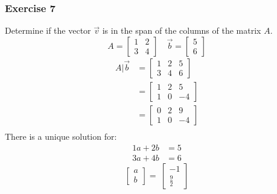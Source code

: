 \documentclass{math}
\begin{document}
\subsubsection*{Exercise 7}
Determine if the vector \( \vec{v} \) is in the span of the columns of the
matrix \( A \).
\[ A = \begin{bmatrix}1 & 2 \\ 3 & 4\end{bmatrix} \quad
  \vec{b} = \begin{bmatrix}5 \\ 6\end{bmatrix} \]
\begin{align*}
  A|\vec{b} &= \begin{bmatrix}
    1 & 2 & 5 \\
    3 & 4 & 6
  \end{bmatrix} \\
  &= \begin{bmatrix}
    1 & 2 & 5 \\
    1 & 0 & -4
  \end{bmatrix} \\
  &= \begin{bmatrix}
    0 & 2 & 9 \\
    1 & 0 & -4
  \end{bmatrix} \\
\end{align*}
There is a unique solution for:
\begin{align*}
  1a+2b &= 5 \\
  3a+4b &= 6
\end{align*}
\[ \begin{bmatrix}a \\ b\end{bmatrix} =\
  \begin{bmatrix}-1 \\ \frac{9}{2}\end{bmatrix} \]
\end{document}
